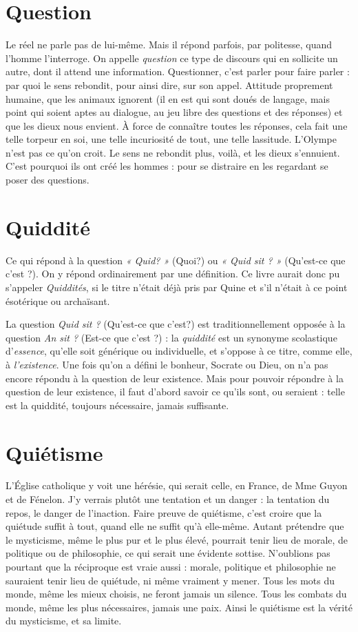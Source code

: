 \section{Question}
Le réel ne parle pas de lui-même. Mais il répond parfois, par
politesse, quand l’homme l’interroge. On appelle {\it question} ce
type de discours qui en sollicite un autre, dont il attend une information.
Questionner, c’est parler pour faire parler : par quoi le sens rebondit, pour ainsi
dire, sur son appel. Attitude proprement humaine, que les animaux ignorent (il
en est qui sont doués de langage, mais point qui soient aptes au dialogue, au jeu
libre des questions et des réponses) et que les dieux nous envient. À force de
connaître toutes les réponses, cela fait une telle torpeur en soi, une telle incuriosité
de tout, une telle lassitude. L’Olympe n’est pas ce qu’on croit. Le sens
ne rebondit plus, voilà, et les dieux s’ennuient. C’est pourquoi ils ont créé les
hommes : pour se distraire en les regardant se poser des questions.

\section{Quiddité}
Ce qui répond à la question {\it « Quid? »} (Quoi?) ou {\it « Quid
sit ? »} (Qu'est-ce que c’est ?). On y répond ordinairement par
une définition. Ce livre aurait donc pu s'appeler {\it Quiddités}, si le titre n’était déjà
pris par Quine et s’il n’était à ce point ésotérique ou archaïsant.

La question {\it Quid sit ?} (Qu'est-ce que c’est?) est traditionnellement
opposée à la question {\it An sit ?} (Est-ce que c’est ?) : la {\it quiddité} est un synonyme
scolastique d’{\it essence}, qu’elle soit générique ou individuelle, et s'oppose à ce
titre, comme elle, à {\it l'existence}. Une fois qu’on a défini le bonheur, Socrate ou
Dieu, on n'a pas encore répondu à la question de leur existence. Mais pour
pouvoir répondre à la question de leur existence, il faut d’abord savoir ce qu'ils
sont, ou seraient : telle est la quiddité, toujours nécessaire, jamais suffisante.

\section{Quiétisme}
L'Église catholique y voit une hérésie, qui serait celle, en
France, de Mme Guyon et de Fénelon. J'y verrais plutôt une
tentation et un danger : la tentation du repos, le danger de l’inaction. Faire
preuve de quiétisme, c’est croire que la quiétude suffit à tout, quand elle ne
suffit qu’à elle-même. Autant prétendre que le mysticisme, même le plus pur et
le plus élevé, pourrait tenir lieu de morale, de politique ou de philosophie, ce
qui serait une évidente sottise. N'oublions pas pourtant que la réciproque est
vraie aussi : morale, politique et philosophie ne sauraient tenir lieu de quiétude,
ni même vraiment y mener. Tous les mots du monde, même les mieux choisis,
ne feront jamais un silence. Tous les combats du monde, même les plus nécessaires,
jamais une paix. Ainsi le quiétisme est la vérité du mysticisme, et sa
limite.

